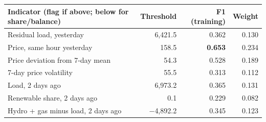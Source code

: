 \begin{tabular}{lrrr}
\toprule
Indicator (flag if above; below for share/balance) & Threshold & F1 (training) & Weight \\
\midrule
Residual load, yesterday & 6,421.5 & 0.362 & 0.130 \\
Price, same hour yesterday & 158.5 & \textbf{0.653} & 0.234 \\
Price deviation from 7-day mean & 54.3 & 0.528 & 0.189 \\
7-day price volatility & 55.5 & 0.313 & 0.112 \\
Load, 2 days ago & 6,973.2 & 0.365 & 0.131 \\
Renewable share, 2 days ago & 0.1 & 0.229 & 0.082 \\
Hydro + gas minus load, 2 days ago & $-$4,892.2 & 0.345 & 0.123 \\
\bottomrule
\end{tabular}

